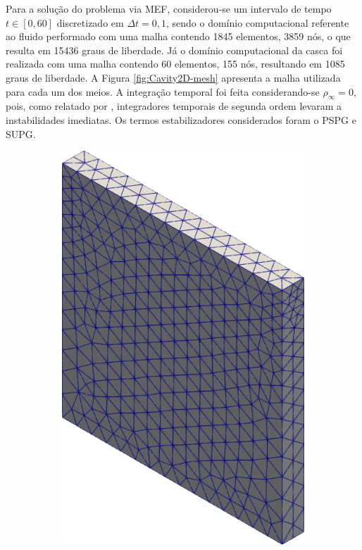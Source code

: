 Para a solução do problema via MEF, considerou-se um intervalo de tempo $t\in[0,60]$ discretizado em $\Delta t=0,1$, sendo o domínio computacional referente ao fluido performado com uma malha contendo 1845 elementos, 3859 nós, o que resulta em 15436 graus de liberdade. Já o domínio computacional da casca foi realizada com uma malha contendo 60 elementos, 155 nós, resultando em 1085 graus de liberdade. A Figura \ref{fig:Cavity2D-mesh} apresenta a malha utilizada para cada um dos meios. A integração temporal foi feita considerando-se $\rho_\infty=0$, pois, como relatado por , integradores temporais de segunda ordem levaram a instabilidades imediatas. Os termos estabilizadores considerados foram o PSPG e SUPG.

\begin{figure}[h!]
    \centering
    \caption{Cavidade bidimensional - Malha utilizada para o domínio:}
    \begin{subfigure}[b]{0.32\textwidth}
        \includegraphics[width=\linewidth]{Figuras/FSI-Cavity2D/fluid-mesh.png}

\end{subfigure}
\end{figure}
